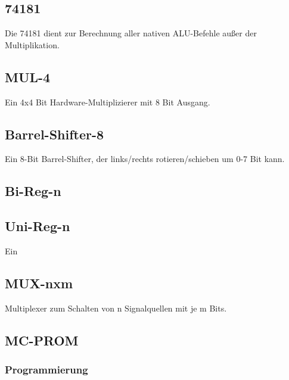 \documentclass[11pt]{report}
\begin{document}
	\subsection{74181}
	Die 74181 dient zur Berechnung aller nativen ALU-Befehle außer der Multiplikation.
	
	\subsection{MUL-4}
	Ein 4x4 Bit Hardware-Multiplizierer mit 8 Bit Ausgang.
	
	\subsection{Barrel-Shifter-8}
	Ein 8-Bit Barrel-Shifter, der links/rechts rotieren/schieben um  0-7 Bit kann.
	\subsection{Bi-Reg-n}
	
	\subsection{Uni-Reg-n}
	Ein 
	
	\subsection{MUX-nxm}
	Multiplexer zum Schalten von n Signalquellen mit je m Bits.
	
	\subsection{MC-PROM}
	\label{microcode_erklaerung}
	\subsubsection{Programmierung}
	
\end{document}
